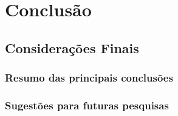 \chapter{Conclusão}\label{chp:conclusion}

\section{Considerações Finais}

\subsection{Resumo das principais conclusões}

\subsection{Sugestões para futuras pesquisas}